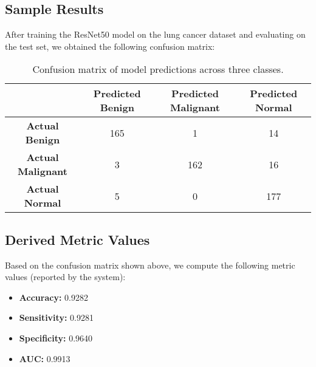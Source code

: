 
\subsection{Sample Results}

After training the ResNet50 model on the lung cancer dataset and evaluating on the test set, we 
obtained the following confusion matrix:

\begin{table}[H]
    \centering
    \begin{tabular}{|c|c|c|c|}
        \hline
        \textbf{} & \textbf{Predicted Benign} & \textbf{Predicted Malignant} & \textbf{Predicted Normal} \\
        \hline
        \textbf{Actual Benign} & 165 & 1 & 14 \\
        \hline
        \textbf{Actual Malignant} & 3 & 162 & 16 \\
        \hline
        \textbf{Actual Normal} & 5 & 0 & 177 \\
        \hline
    \end{tabular}
    \caption{Confusion matrix of model predictions across three classes.}
\end{table}


\subsection{Derived Metric Values}

Based on the confusion matrix shown above, we compute the following metric values (reported by the system):

\begin{itemize}
    \item \textbf{Accuracy:} 0.9282
    \item \textbf{Sensitivity:} 0.9281
    \item \textbf{Specificity:} 0.9640
    \item \textbf{AUC:} 0.9913
\end{itemize}

